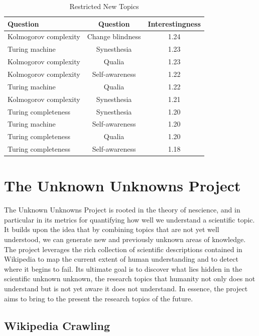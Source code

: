 \begin{table}
\begin{centering}
\begin{tabular}{|l|c|c|}
\hline 
{Question} & Question & Interestingness\tabularnewline
\hline 
\hline 
Kolmogorov complexity & Change blindness & 1.24\tabularnewline
\hline 
{Turing machine} & Synesthesia & 1.23\tabularnewline
\hline 
Kolmogorov complexity & Qualia & 1.23\tabularnewline
\hline 
Kolmogorov complexity & Self-awareness & 1.22\tabularnewline
\hline 
Turing machine & Qualia & 1.22\tabularnewline
\hline 
Kolmogorov complexity & Synesthesia & 1.21\tabularnewline
\hline 
Turing completeness & Synesthesia & 1.20\tabularnewline
\hline 
Turing machine & Self-awareness & 1.20\tabularnewline
\hline 
Turing completeness & Qualia & 1.20\tabularnewline
\hline 
Turing completeness & Self-awareness & 1.18\tabularnewline
\hline 
\end{tabular}
\par\end{centering}

\caption{\label{tab:Restricted-Serendipity}Restricted New Topics}
\end{table}

%
%
\section{The Unknown Unknowns Project}

The Unknown Unknowns Project is rooted in the theory of nescience, and in particular in its metrics for quantifying how well we understand a scientific topic. It builds upon the idea that by combining topics that are not yet well understood, we can generate new and previously unknown areas of knowledge. The project leverages the rich collection of scientific descriptions contained in Wikipedia to map the current extent of human understanding and to detect where it begins to fail. Its ultimate goal is to discover what lies hidden in the scientific unknown unknown, the research topics that humanity not only does not understand but is not yet aware it does not understand. In essence, the project aims to bring to the present the research topics of the future.

\subsection*{Wikipedia Crawling}

